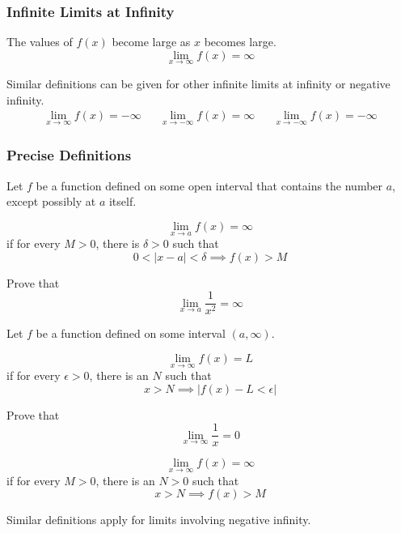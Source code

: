 \subsubsection{Infinite Limits at Infinity}
\begin{definition}
    The values of \(f(x)\) become large as \(x\) becomes large.
    \[\lim_{x\to \infty}f(x)=\infty\]
\end{definition}
Similar definitions can be given for other infinite limits at infinity or
negative infinity.
\begin{align*}
    &\lim_{x\to \infty}f(x)=-\infty&&\lim_{x\to -\infty}f(x)=\infty&
    &\lim_{x\to -\infty}f(x)=-\infty&
\end{align*}

\subsubsection{Precise Definitions}
Let \(f\) be a function defined on some open interval that contains the number
\(a\), except possibly at \(a\) itself.
\begin{definition}
    \[\lim_{x\to a}f(x)=\infty\] if for every \(M>0\), there is
    \(\delta>0\) such that \[0<|x-a|<\delta\implies f(x)>M\]
\end{definition}
\begin{problem}
    Prove that \[\lim_{x\to a}\frac{1}{x^2}=\infty\]
\end{problem}
Let \(f\) be a function defined on some interval \((a,\infty)\).
\begin{definition}
    \[\lim_{x\to \infty}f(x)=L\] if for every \(\epsilon>0\), there is an \(N\)
    such that \[x>N\implies|f(x)-L<\epsilon|\]
\end{definition}
\begin{problem}
    Prove that \[\lim_{x\to \infty}\frac{1}{x}=0\]
\end{problem}
\begin{definition}
    \[\lim_{x\to \infty}f(x)=\infty\] if for every \(M>0\), there is an \(N>0\)
    such that \[x>N\implies f(x)>M\]
\end{definition}
Similar definitions apply for limits involving negative infinity.